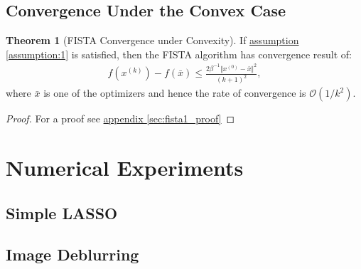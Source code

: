 \documentclass[]{article}
\theoremstyle{definition}
\newtheorem{theorem}{Theorem}       %
\begin{document}
    \subsection{Convergence Under the Convex Case}
        \begin{theorem}[FISTA Convergence under Convexity]\label{thm:fista_convergence1}
            If \hyperref[assumption:1]{assumption \ref*{assumption:1}} is satisfied, then the FISTA algorithm has convergence result of: 
            \begin{align*}
                f(x^{(k)}) - f(\bar x) \le 
                \frac{2\beta^{-1}\Vert x^{(0)} - \bar x\Vert^2}
            {(k + 1)^2},
            \end{align*}
            where $\bar x$ is one of the optimizers and hence the rate of convergence is $\mathcal O(1/k^2)$. 
        \end{theorem}
        \begin{proof}
            For a proof see \hyperref[sec:fista1_proof]{appendix \ref*{sec:fista1_proof}}
        \end{proof}

\section{Numerical Experiments}
    \subsection*{Simple LASSO}
    \subsection*{Image Deblurring}
\end{document}
